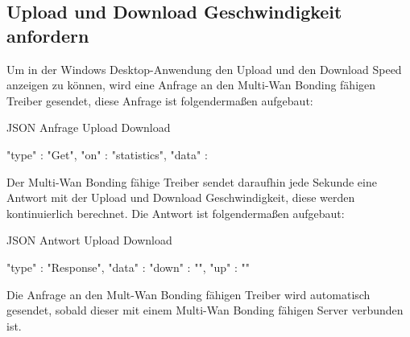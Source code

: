\subsection{Upload und Download Geschwindigkeit anfordern}
Um in der Windows Desktop-Anwendung den Upload und den Download Speed anzeigen zu können, wird eine Anfrage an den Multi-Wan Bonding fähigen Treiber gesendet, diese Anfrage ist folgendermaßen aufgebaut:
\begin{program}[H]
\caption{JSON Anfrage Upload Download}
\begin{GenericCode}
    {
        "type" :  "Get",
        "on" :  "statistics",
        "data" : {} 
    }     
\end{GenericCode}
\end{program}
\noindent
Der Multi-Wan Bonding fähige Treiber sendet daraufhin jede Sekunde eine Antwort mit der Upload und Download Geschwindigkeit, diese werden kontinuierlich berechnet. Die Antwort ist folgendermaßen aufgebaut:
\begin{program}[H]
\caption{JSON Antwort Upload Download}
\begin{GenericCode}
    {
        "type" :  "Response",
        "data" : {
                    "down" : "",
                    "up" : ""
        } 
    }    
\end{GenericCode}
\end{program}
\noindent
Die Anfrage an den Mult-Wan Bonding fähigen Treiber wird automatisch gesendet, sobald dieser mit einem Multi-Wan Bonding fähigen Server verbunden ist. 